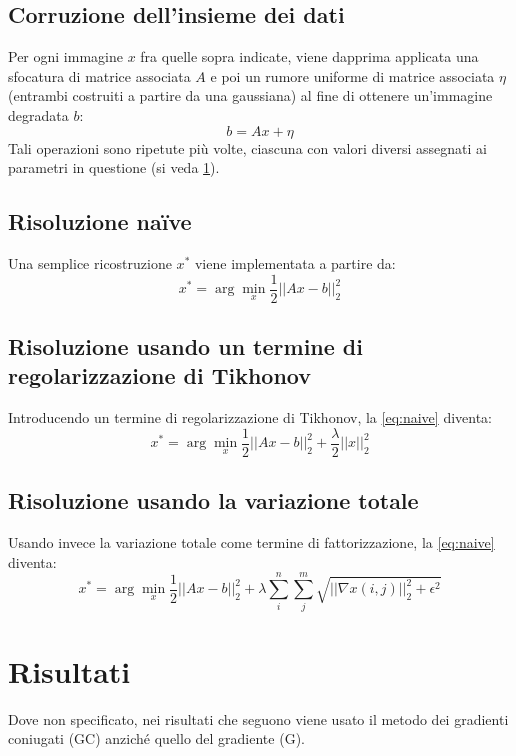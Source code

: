\documentclass[a4paper]{article}
\begin{document}
\subsection{Corruzione dell'insieme dei dati}
Per ogni immagine $x$ fra quelle sopra indicate, viene dapprima applicata una
sfocatura di matrice associata $A$ e poi un rumore uniforme di matrice associata
$\eta$ (entrambi costruiti a partire da una gaussiana) al fine di ottenere
un'immagine degradata $b$:
\begin{equation}\label{eq:degradation}
  b = Ax + \eta
\end{equation}
Tali operazioni sono ripetute più volte, ciascuna con valori diversi assegnati
ai parametri in questione (si veda \ref{results}).

\subsection{Risoluzione naïve}
Una semplice ricostruzione $x^*$ viene implementata a partire da:
\begin{equation}\label{eq:naive}
  x^* = \arg \min_{x} \frac{1}{2}||Ax - b||^2_2
\end{equation}

\subsection{Risoluzione usando un termine di regolarizzazione di Tikhonov}
Introducendo un termine di regolarizzazione di Tikhonov, la \eqref{eq:naive}
diventa:
\begin{equation}
  x^* = \arg \min_{x} \frac{1}{2}||Ax - b||^2_2 + \frac{\lambda}{2}||x||^2_2
\end{equation}

\subsection{Risoluzione usando la variazione totale}
Usando invece la variazione totale come termine di fattorizzazione, la
\eqref{eq:naive} diventa:
\begin{equation}
  x^* = \arg \min_{x} \frac{1}{2}||Ax - b||^2_2 +
  \lambda\sum_i^n\sum_j^m\sqrt{||\nabla x(i,j)||_2^2+\epsilon^2}
\end{equation}

\section{Risultati}\label{results}
Dove non specificato, nei risultati che seguono viene usato il metodo dei
gradienti coniugati (GC) anziché quello del gradiente (G). 
\end{document}
